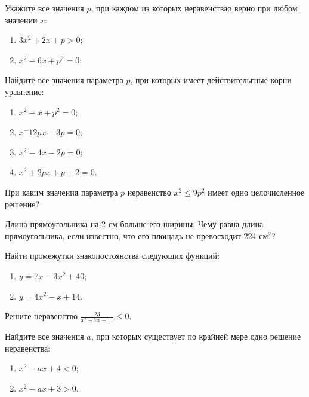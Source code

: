 \documentclass[algebra,twocolumn]{pum}
\begin{document}
\begin{exercises}
  \begin{question}
    Укажите все значения $p$, при каждом из которых неравенствао верно при любом значении $x$:
    \begin{multicols}{2}
      \begin{enumerate}
        \item $3x^2+2x+p>0$;
        \item $x^2-6x+p^2=0$;
      \end{enumerate}
    \end{multicols}
  \end{question}
  \begin{question}
    Найдите все значения параметра $p$, при которых имеет действительгные корни уравнение:
    \begin{multicols}{2}
      \begin{enumerate}
        \item $x^2-x+p^2=0$;
        \item $x^-12px-3p=0$;
        \item $x^2-4x-2p=0$;
        \item $x^2+2px+p+2=0$.
      \end{enumerate}
    \end{multicols}
  \end{question}
  \begin{question}
    При каким значения параметра $p$ неравенство $x^2\le9p^2$ имеет одно целочисленное решение?
  \end{question}
  \begin{question}
    Длина прямоугольника на 2 см больше его ширины. Чему равна длина прямоугольника, если известно, что его площадь не превосходит 224 см$^2$?
  \end{question}
  \begin{question}
    Найти промежутки знакопостоянства следующих функций:
    \begin{multicols}{2}
      \begin{enumerate}
        \item $y=7x-3x^2+40$;
        \item $y=4x^2-x+14$.
      \end{enumerate}
    \end{multicols}
  \end{question}
  \begin{question}
    Решите неравенство $\frac{23}{x^2-7x-11}\le0$.
  \end{question}
  \begin{question}
    Найдите все значения $a$, при которых существует по крайней мере одно решение неравенства:
    \begin{multicols}{2}
      \begin{enumerate}
        \item $x^2-ax+4<0$;
        \item $x^2-ax+3>0$.
      \end{enumerate}
    \end{multicols}
  \end{question}
\end{exercises}

\end{document}
